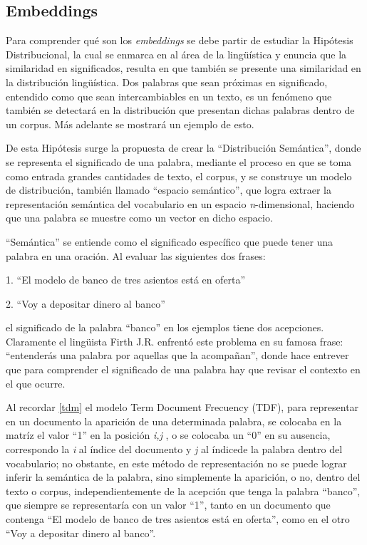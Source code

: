 \documentclass[
  10,
  openany]{book}
\begin{document}
\hypertarget{embed}{%
\subsection{Embeddings}\label{embed}}

Para comprender qué son los \emph{embeddings} se debe partir de estudiar la Hipótesis~ Distribucional, la cual se enmarca en al área de la lingüística y enuncia que la similaridad en significados, resulta en que también se presente una similaridad en la distribución lingüística. Dos palabras que sean próximas en significado, entendido como que sean intercambiables en un texto, es un fenómeno que también se detectará en la distribución que presentan dichas palabras dentro de un corpus. Más adelante se mostrará un ejemplo de esto.

De esta Hipótesis surge la propuesta de crear la ``Distribución Semántica'', donde se representa el significado de una palabra, mediante el proceso en que se toma como entrada grandes cantidades de texto, el corpus, y se construye un modelo de distribución, también llamado ``espacio semántico'', que logra extraer la representación semántica del vocabulario en un espacio \emph{n}-dimensional, haciendo que una palabra se muestre como un vector en dicho espacio.

``Semántica'' se entiende como el significado específico que puede tener una palabra en una oración. Al evaluar las siguientes dos frases:

1. ``El modelo de banco de tres asientos está en oferta''

2. ``Voy a depositar dinero al banco''

el significado de la palabra ``banco'' en los ejemplos tiene dos acepciones. Claramente el lingüista Firth J.R. enfrentó este problema en su famosa frase: ``entenderás una palabra por aquellas que la acompañan'', donde hace entrever que para comprender el significado de una palabra hay que revisar el contexto en el que ocurre.

Al recordar \ref{tdm} el modelo Term Document Frecuency (TDF), para representar en un documento la aparición de una determinada palabra, se colocaba en la matríz el valor ``1'' en la posición \emph{i,j} , o se colocaba un ``0'' en su ausencia, correspondo la \emph{i} al índice del documento y \emph{j} al índicede la palabra dentro del vocabulario; no obstante, en este método de representación no se puede lograr inferir la semántica de la palabra, sino simplemente la aparición, o no, dentro del texto o corpus, independientemente de la acepción que tenga la palabra ``banco'', que siempre se representaría con un valor ``1'', tanto en un documento que contenga ``El modelo de banco de tres asientos está en oferta'', como en el otro ``Voy a depositar dinero al banco''.
\end{document}
